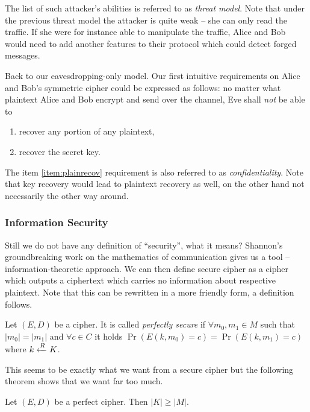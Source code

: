 The list of such attacker's abilities is referred to as {\em threat model}. Note that under the previous threat model the attacker is quite weak -- she can only read the traffic. If she were for instance able to manipulate the traffic, Alice and Bob would need to add another features to their protocol which could detect forged messages.

Back to our eavesdropping-only model. Our first intuitive requirements on Alice and Bob's symmetric cipher could be expressed as follows: no matter what plaintext Alice and Bob encrypt and send over the channel, Eve shall {\em not} be able to
\begin{enumerate}
	\item recover any portion of any plaintext, \label{item:plainrecov}
	\item recover the secret key. \label{item:keyrecov}
\end{enumerate}
The item \ref{item:plainrecov} requirement is also referred to as {\em confidentiality}. Note that key recovery would lead to plaintext recovery as well, on the other hand not necessarily the other way around.

\subsubsection{Information Security}

Still we do not have any definition of ``security'', what it means? Shannon's groundbreaking work \cite{shannon1949mathematical} on the mathematics of communication gives us a tool -- information-theoretic approach. We can then define secure cipher as a cipher which outputs a ciphertext which carries no information about respective plaintext. Note that this can be rewritten in a more friendly form, a definition follows.

\begin{defn}
	Let $(E,D)$ be a cipher. It is called {\em perfectly secure} if $\forall m_0,m_1\in M$ such that $|m_0| = |m_1|$ and $\forall c\in C$ it holds $\Pr\left(E(k,m_0)=c\right) = \Pr\left(E(k,m_1)=c\right)$ where $k\xleftarrow{R} K$.
\end{defn}

This seems to be exactly what we want from a secure cipher but the following theorem shows that we want far too much.

\begin{thm}
	Let $(E,D)$ be a perfect cipher. Then $|K| \geq |M|$.
\end{thm}

